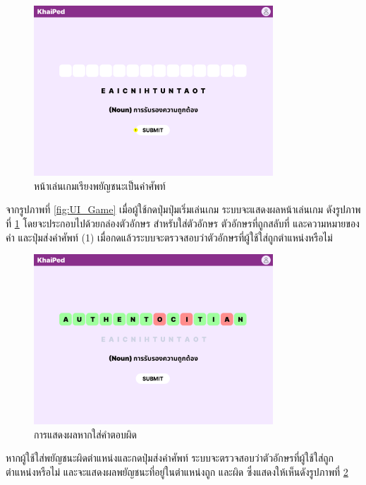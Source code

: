 \documentclass[12pt,oneside,openright,a4paper]{cpe-thai-project}
\begin{document}
\begin{figure}[!h]\centering
	\includegraphics[width=0.8\textwidth, keepaspectratio=true]{image/chap3/ui/game/Word Scramble - Start.png}
	\caption{หน้าเล่นเกมเรียงพยัญชนะเป็นคำศัพท์}\label{fig:UI_StartGame}
\end{figure}
\hspace{1cm}
จากรูปภาพที่ \ref{fig:UI_Game} เมื่อผู้ใช้กดปุ่มปุ่มเริ่มเล่นเกม ระบบจะแสดงผลหน้าเล่นเกม ดังรูปภาพที่ \ref{fig:UI_StartGame} 
โดยจะประกอบไปด้วยกล่องตัวอักษร สำหรับใส่ตัวอักษร ตัวอักษรที่ถูกสลับที่
และความหมายของคำ และปุ่มส่งคำศัพท์ (1) เมื่อกดแล้วระบบจะตรวจสอบว่าตัวอักษรที่ผู้ใช้ใส่ถูกตำแหน่งหรือไม่

\pagebreak
\begin{figure}[!h]\centering
	\includegraphics[width=0.8\textwidth, keepaspectratio=true]{image/chap3/ui/game/Word Scramble - Wrong Answer.png}
	\caption{การแสดงผลหากใส่คำตอบผิด}\label{fig:UI_GameWrong}
\end{figure}
\hspace{1cm}
หากผู้ใช้ใส่พยัญชนะผิดตำแหน่งและกดปุ่มส่งคำศัพท์ ระบบจะตรวจสอบว่าตัวอักษรที่ผู้ใช้ใส่ถูกตำแหน่งหรือไม่ และจะแสดงผลพยัญชนะที่อยู่ในตำแหน่งถูก และผิด
ซึ่งแสดงให้เห็นดังรูปภาพที่ \ref{fig:UI_GameWrong}
\end{document}
